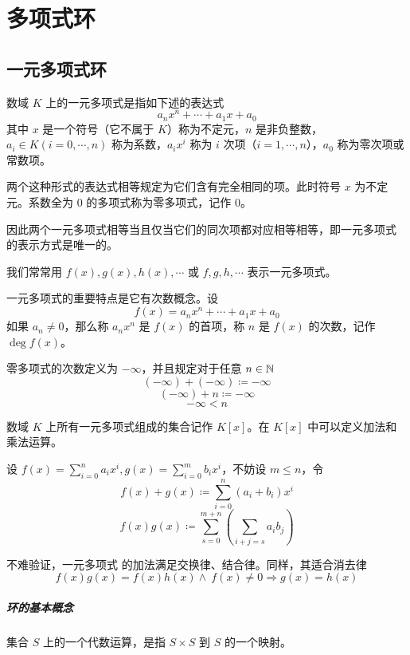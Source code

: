 \chapter{多项式环}

\section{一元多项式环}

\begin{definition}[一元多项式]
    数域 $K$ 上的一元多项式是指如下述的表达式
    \[a_nx^n+\cdots + a_1x + a_0\]
    其中 $x$ 是一个符号（它不属于 $K$）称为不定元，$n$ 是非负整数，$a_i\in K(i=0,\cdots,n)$ 称为系数，$a_ix^i$ 称为 $i$ 次项（$i=1,\cdots,n$），$a_0$ 称为零次项或常数项。
\end{definition}

两个这种形式的表达式相等规定为它们含有完全相同的项。此时符号 $x$ 为不定元。系数全为 $0$ 的多项式称为零多项式，记作 $0$。

因此两个一元多项式相等当且仅当它们的同次项都对应相等相等，即一元多项式 的表示方式是唯一的。

我们常常用 $f(x),g(x),h(x),\cdots$ 或 $f,g,h,\cdots$ 表示一元多项式。

一元多项式的重要特点是它有次数概念。设
\[f(x) = a_nx^n+\cdots + a_1x + a_0\]
如果 $a_n\ne 0$，那么称 $a_nx^n$ 是 $f(x)$ 的首项，称 $n$ 是 $f(x)$ 的次数，记作 $\deg f(x)$。

零多项式的次数定义为 $-\infty$，并且规定对于任意 $n\in \mathbb{N}$
\[(-\infty)+(-\infty)\coloneqq -\infty\]
\[(-\infty) +n \coloneqq  -\infty\]
\[-\infty < n\]

数域 $K$ 上所有一元多项式组成的集合记作 $K[x]$。在 $K[x]$ 中可以定义加法和乘法运算。

设 $f(x) = \displaystyle\sum_{i=0}^na_ix^i,g(x) = \sum_{i=0}^mb_ix^i$，不妨设 $m \leqslant n$，令
\[f(x) + g(x) \coloneqq  \sum_{i=0}^n(a_i+b_i)x^i\]
\[f(x)g(x) \coloneqq  \sum_{s=0}^{m+n}\left(\sum_{i+j=s}a_ib_j\right)\]

不难验证，一元多项式 的加法满足交换律、结合律。同样，其适合消去律
\[f(x)g(x) = f(x)h(x) \land \ f(x)\ne 0 \Rightarrow g(x) = h(x)\]

\paragraph{环的基本概念}

集合 $S$ 上的一个代数运算，是指 $S\times S$ 到 $S$ 的一个映射。

